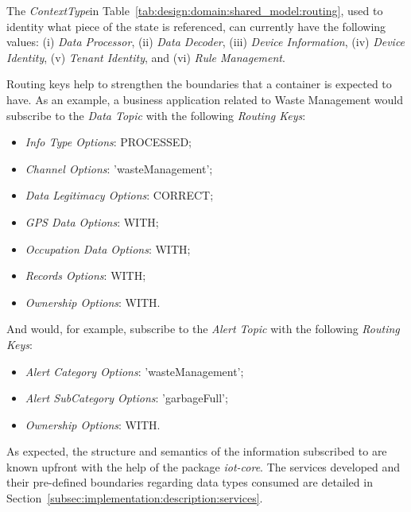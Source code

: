 The \textit{ContextType}in Table~\ref{tab:design:domain:shared_model:routing}, used to identity what piece of the state is referenced, can currently have the following values: (i) \textit{Data Processor}, (ii) \textit{Data Decoder}, (iii) \textit{Device Information}, (iv) \textit{Device Identity}, (v) \textit{Tenant Identity}, and (vi) \textit{Rule Management}.

Routing keys help to strengthen the boundaries that a container is expected to have. As an example, a business application related to Waste Management would subscribe to the \textit{Data Topic} with the following \textit{Routing Keys}:

\begin{itemize}
   \item \textit{Info Type Options}: PROCESSED;
   \item \textit{Channel Options}: 'wasteManagement';
   \item \textit{Data Legitimacy Options}: CORRECT;
   \item \textit{GPS Data Options}: WITH;
   \item \textit{Occupation Data Options}: WITH;
   \item \textit{Records Options}: WITH;
   \item \textit{Ownership Options}: WITH.
\end{itemize}

And would, for example, subscribe to the \textit{Alert Topic} with the following \textit{Routing Keys}:

\begin{itemize}
   \item \textit{Alert Category Options}: 'wasteManagement';
   \item \textit{Alert SubCategory Options}: 'garbageFull';
   \item \textit{Ownership Options}: WITH.
\end{itemize}

As expected, the structure and semantics of the information subscribed to are known upfront with the help of the package \textit{iot-core}. The services developed and their pre-defined boundaries regarding data types consumed are detailed in Section~\ref{subsec:implementation:description:services}.

